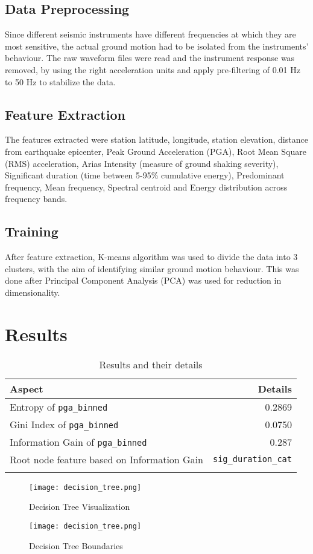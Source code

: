 \documentclass[conference]{IEEEtran}
\begin{document}
\subsection{Data Preprocessing}
\label{sec:orgdac2412}
Since different seismic instruments have different frequencies at which they are
most sensitive, the actual ground motion had to be isolated from the
instruments' behaviour. The raw waveform files were read and the instrument
response was removed, by using the right acceleration units and apply
pre-filtering of 0.01 Hz to 50 Hz to stabilize the data.
\subsection{Feature Extraction}
\label{sec:org680aaf5}
The features extracted were station latitude, longitude, station elevation,
distance from earthquake epicenter, Peak Ground Acceleration (PGA), Root Mean
Square (RMS) acceleration, Arias Intensity (measure of ground shaking severity),
Significant duration (time between 5-95\% cumulative energy), Predominant
frequency, Mean frequency, Spectral centroid and Energy distribution across
frequency bands.
\subsection{Training}
\label{sec:org6d71755}
After feature extraction, K-means algorithm was used to divide the data into 3
clusters, with the aim of identifying similar ground motion behaviour. This was
done after Principal Component Analysis (PCA) was used for reduction in
dimensionality.
\section{Results}
\label{sec:orgade53fd}

\begin{table}[htbp]
\caption{Results and their details}
\centering
\begin{tabular}{lr}
Aspect & Details\\
\hline
Entropy of \texttt{pga\_binned} & 0.2869\\
Gini Index of \texttt{pga\_binned} & 0.0750\\
Information Gain of \texttt{pga\_binned} & 0.287\\
Root node feature based on Information Gain & \texttt{sig\_duration\_cat}\\
 & \\
\end{tabular}
\end{table}


\begin{figure}[htbp]
    \centering
    \texttt{[image: decision\_tree.png]}
    \caption{Decision Tree Visualization}
    \label{fig:example}
\end{figure}


\begin{figure}[htbp]
    \centering
    \texttt{[image: decision\_tree.png]}
    \caption{Decision Tree Boundaries}
    \label{fig:example}
\end{figure}
\end{document}
